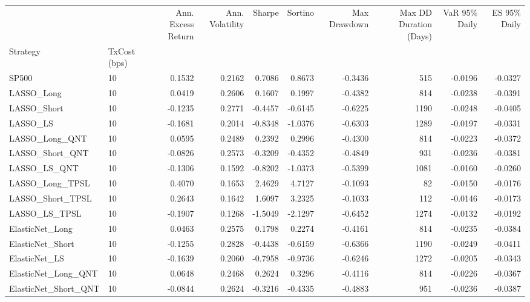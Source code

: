\begin{tabular}{llrrrrrrrr}
\toprule
 &  & Ann. Excess Return & Ann. Volatility & Sharpe & Sortino & Max Drawdown & Max DD Duration (Days) & VaR 95\% Daily & ES 95\% Daily \\
Strategy & TxCost (bps) &  &  &  &  &  &  &  &  \\
\midrule
SP500 & 10 & 0.1532 & 0.2162 & 0.7086 & 0.8673 & -0.3436 & 515 & -0.0196 & -0.0327 \\
\cline{1-10}
LASSO\_Long & 10 & 0.0419 & 0.2606 & 0.1607 & 0.1997 & -0.4382 & 814 & -0.0238 & -0.0391 \\
\cline{1-10}
LASSO\_Short & 10 & -0.1235 & 0.2771 & -0.4457 & -0.6145 & -0.6225 & 1190 & -0.0248 & -0.0405 \\
\cline{1-10}
LASSO\_LS & 10 & -0.1681 & 0.2014 & -0.8348 & -1.0376 & -0.6303 & 1289 & -0.0197 & -0.0331 \\
\cline{1-10}
LASSO\_Long\_QNT & 10 & 0.0595 & 0.2489 & 0.2392 & 0.2996 & -0.4300 & 814 & -0.0223 & -0.0372 \\
\cline{1-10}
LASSO\_Short\_QNT & 10 & -0.0826 & 0.2573 & -0.3209 & -0.4352 & -0.4849 & 931 & -0.0236 & -0.0381 \\
\cline{1-10}
LASSO\_LS\_QNT & 10 & -0.1306 & 0.1592 & -0.8202 & -1.0373 & -0.5399 & 1081 & -0.0160 & -0.0260 \\
\cline{1-10}
LASSO\_Long\_TPSL & 10 & 0.4070 & 0.1653 & 2.4629 & 4.7127 & -0.1093 & 82 & -0.0150 & -0.0176 \\
\cline{1-10}
LASSO\_Short\_TPSL & 10 & 0.2643 & 0.1642 & 1.6097 & 3.2325 & -0.1033 & 112 & -0.0146 & -0.0173 \\
\cline{1-10}
LASSO\_LS\_TPSL & 10 & -0.1907 & 0.1268 & -1.5049 & -2.1297 & -0.6452 & 1274 & -0.0132 & -0.0192 \\
\cline{1-10}
ElasticNet\_Long & 10 & 0.0463 & 0.2575 & 0.1798 & 0.2274 & -0.4161 & 814 & -0.0235 & -0.0384 \\
\cline{1-10}
ElasticNet\_Short & 10 & -0.1255 & 0.2828 & -0.4438 & -0.6159 & -0.6366 & 1190 & -0.0249 & -0.0411 \\
\cline{1-10}
ElasticNet\_LS & 10 & -0.1639 & 0.2060 & -0.7958 & -0.9736 & -0.6246 & 1272 & -0.0205 & -0.0343 \\
\cline{1-10}
ElasticNet\_Long\_QNT & 10 & 0.0648 & 0.2468 & 0.2624 & 0.3296 & -0.4116 & 814 & -0.0226 & -0.0367 \\
\cline{1-10}
ElasticNet\_Short\_QNT & 10 & -0.0844 & 0.2624 & -0.3216 & -0.4335 & -0.4883 & 951 & -0.0236 & -0.0387 \\

\end{tabular}
